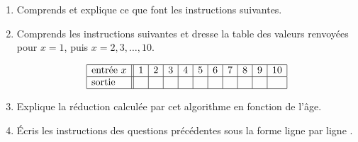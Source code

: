 \documentclass[class=report,crop=false, 12pt]{standalone}
\begin{document}
\begin{activite}
\sauteligne
\begin{enumerate}
  \item Comprends et explique ce que font les instructions suivantes.
  
  \item Comprends les instructions suivantes et dresse la table des valeurs renvoyées pour $x=1$, puis $x=2,3,\ldots, 10$.
  
  
    $$\begin{array}{|l||c|c|c|c|c|c|c|c|c|c|c}
  \hline
  \text{entrée } x & 1&2&3&4&5&6&7&8&9&10 \\
  \hline
  \text{sortie } & &&&&&&&&& \\
  \hline
  \end{array}  
  $$ 
  
  
  \item Explique la réduction calculée par cet algorithme en fonction de l'âge.
  



  \item Écris les instructions des questions précédentes sous la forme \og ligne par ligne \fg{}. 
  
  
\end{enumerate}
\end{activite}
\end{document}
